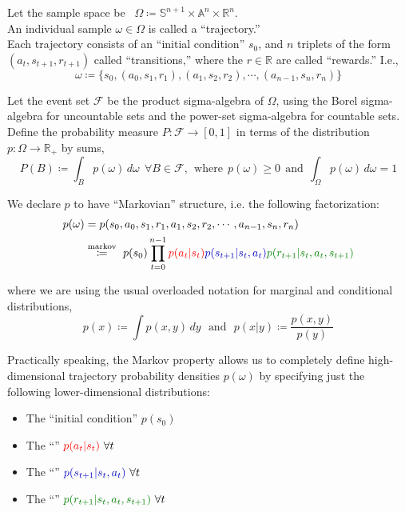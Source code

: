 Let the sample space be \ $\Omega \coloneqq \mathbb{S}^{n+1} \times \mathbb{A}^n \times \mathbb{R}^n$.\\
An individual sample $\omega \in \Omega$ is called a ``trajectory.''\\

Each trajectory consists of an ``initial condition'' $s_0$, and $n$ triplets of the form $(a_t, s_{t+1}, r_{t+1})$ called ``transitions,'' where the $r \in \mathbb{R}$ are called ``rewards.'' I.e.,
\begin{equation*}
\omega \coloneqq \{s_0, (a_0, s_1, r_1), (a_1, s_2, r_2), \cdots, (a_{n-1}, s_{n}, r_n)\}
\end{equation*}

Let the event set $\mathcal{F}$ be the product sigma-algebra of $\Omega$, using the Borel sigma-algebra for uncountable sets and the power-set sigma-algebra for countable sets.\\

Define the probability measure $P : \mathcal{F} \to [0,1]$ in terms of the distribution $p : \Omega \to \mathbb{R}_+$ by sums,
\begin{equation*}
P(B) \coloneqq \int_B p(\omega)\, d\omega\ \ \forall B \in \mathcal{F},\ \ \text{where}\ \ p(\omega)\geq0\ \ \text{and}\ \ \int_\Omega p(\omega)\,d\omega = 1
\end{equation*}

We declare $p$ to have ``Markovian'' structure, i.e. the following factorization:
\begin{align*}
p(\omega) &= p(s_0, a_0, s_1, r_1, a_1, s_2, r_2, \cdots, a_{n-1}, s_{n}, r_n)\\
&\stackrel{\text{markov}}{\coloneqq}\ p(s_0) \prod_{t=0}^{n-1} \red{p(a_t|s_t)}\blue{p(s_{t+1}|s_t,a_t)}\green{p(r_{t+1}|s_t,a_t,s_{t+1})}
\end{align*}

where we are using the usual overloaded notation for marginal and conditional distributions,\\
\begin{equation*}
p(x) \coloneqq \int p(x,y)\,dy\ \ \ \text{and}\ \ \ p(x|y) \coloneqq \frac{p(x,y)}{p(y)}
\end{equation*}

Practically speaking, the Markov property allows us to completely define high-dimensional trajectory probability densities $p(\omega)$ by specifying just the following lower-dimensional distributions:
\begin{itemize}
  \item The ``initial condition'' $p(s_0)$
  \item The ``'' $\textcolor{red}{p(a_t|s_t)}\ \forall t$
  \item The ``'' $\blue{p(s_{t+1}|s_t,a_t)}\ \forall t$
  \item The ``'' $\green{p(r_{t+1}|s_t,a_t,s_{t+1})}\ \forall t$
\end{itemize}

